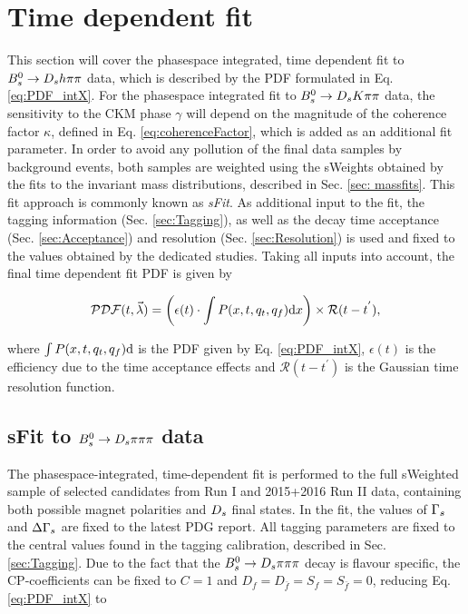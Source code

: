 \section{Time dependent fit}
\label{sec:Tfit}

This section will cover the phasespace integrated, time dependent fit to ${{B}^0_{s}}\rightarrow{\ensuremath{{D}_{s}}}{\ensuremath{h}}{\ensuremath{\pi}}{\ensuremath{\pi}}$ data, which is described by the PDF formulated in Eq. \ref{eq:PDF_intX}.
For the phasespace integrated fit to ${{B}^0_{s}}\rightarrow{\ensuremath{{D}_{s}}}{\ensuremath{K}}{\ensuremath{\pi}}{\ensuremath{\pi}}$ data, the sensitivity to the CKM phase $\gamma$ will depend on the magnitude of the coherence factor $\kappa$, defined in Eq. \ref{eq:coherenceFactor}, 
which is added as an additional fit parameter. 
In order to avoid any pollution of the final data samples by background events, both samples are weighted using the sWeights obtained by the fits to the invariant mass distributions, described in Sec. \ref{sec: massfits}.
This fit approach is commonly known as \textit{sFit}. 
As additional input to the fit, the tagging information (Sec. \ref{sec:Tagging}), 
as well as the decay time acceptance (Sec. \ref{sec:Acceptance}) and resolution (Sec. \ref{sec:Resolution}) is used and fixed to the values obtained by the dedicated studies. 
Taking all inputs into account, the final time dependent fit PDF is given by

\begin{equation}
\label{eq:TPDF_full}
\mathcal{PDF}(t,\vec{\lambda}) = \left(\epsilon(t)\cdot \int P(x,t,q_t,q_f) \text d x \right) \times \mathcal{R}(t - t^{'}),
\end{equation}

where $\int P(x,t,q_t,q_f) \text d$ is the PDF given by Eq. \ref{eq:PDF_intX}, $\epsilon(t)$ is the efficiency due to the time acceptance effects and $\mathcal{R}(t - t^{'})$ is the Gaussian time resolution function. 



\subsection{sFit to ${{B}^0_{s}}\rightarrow{\ensuremath{{D}_{s}}}{\ensuremath{\pi}}{\ensuremath{\pi}}{\ensuremath{\pi}}$ data}  
The phasespace-integrated, time-dependent fit is performed to the full sWeighted sample of selected candidates from Run I and 2015+2016 Run II data, containing both possible magnet polarities and ${{D}_{s}}$ final states.
In the fit, the values of ${\Gamma_{{s}}}$ and ${\Delta\Gamma_{{s}}}$ are fixed to the latest PDG report. All tagging parameters are fixed to the central values found in the tagging calibration, described in Sec. \ref{sec:Tagging}.
Due to the fact that the ${{B}^0_{s}}\rightarrow{\ensuremath{{D}_{s}}}{\ensuremath{\pi}}{\ensuremath{\pi}}{\ensuremath{\pi}}$ decay is flavour specific, the CP-coefficients can be fixed to $C=1$ and $D_{f} = D_{\bar{f}} = S_{f} = S_{\bar{f}} = 0$, reducing Eq. \ref{eq:PDF_intX} to

